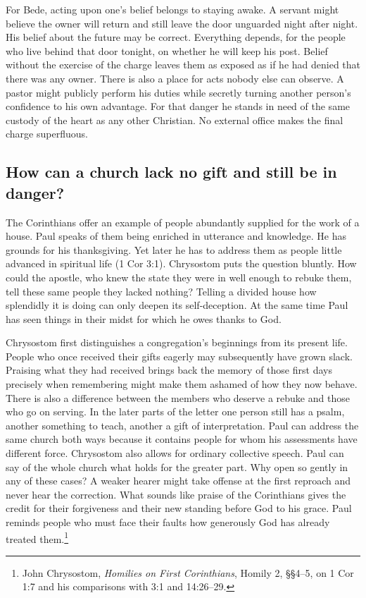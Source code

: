 For Bede, acting upon one's belief belongs to staying awake. A servant might believe the owner will return and still leave the door unguarded night after night. His belief about the future may be correct. Everything depends, for the people who live behind that door tonight, on whether he will keep his post. Belief without the exercise of the charge leaves them as exposed as if he had denied that there was any owner. There is also a place for acts nobody else can observe. A pastor might publicly perform his duties while secretly turning another person's confidence to his own advantage. For that danger he stands in need of the same custody of the heart as any other Christian. No external office makes the final charge superfluous.

\subsection{How can a church lack no gift and still be in danger?}

The Corinthians offer an example of people abundantly supplied for the work of a house. Paul speaks of them being enriched in utterance and knowledge. He has grounds for his thanksgiving. Yet later he has to address them as people little advanced in spiritual life (1 Cor 3:1). Chrysostom puts the question bluntly. How could the apostle, who knew the state they were in well enough to rebuke them, tell these same people they lacked nothing? Telling a divided house how splendidly it is doing can only deepen its self-deception. At the same time Paul has seen things in their midst for which he owes thanks to God.

Chrysostom first distinguishes a congregation's beginnings from its present life. People who once received their gifts eagerly may subsequently have grown slack. Praising what they had received brings back the memory of those first days precisely when remembering might make them ashamed of how they now behave. There is also a difference between the members who deserve a rebuke and those who go on serving. In the later parts of the letter one person still has a psalm, another something to teach, another a gift of interpretation. Paul can address the same church both ways because it contains people for whom his assessments have different force. Chrysostom also allows for ordinary collective speech. Paul can say of the whole church what holds for the greater part. Why open so gently in any of these cases? A weaker hearer might take offense at the first reproach and never hear the correction. What sounds like praise of the Corinthians gives the credit for their forgiveness and their new standing before God to his grace. Paul reminds people who must face their faults how generously God has already treated them.\footnote{John Chrysostom, \textit{Homilies on First Corinthians}, Homily 2, §§4--5, on 1 Cor 1:7 and his comparisons with 3:1 and 14:26--29.}

